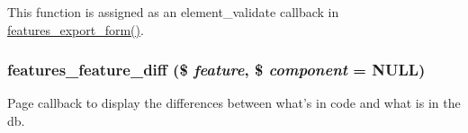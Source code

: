 This function is assigned as an element\_\-validate callback in \hyperlink{group__forms_gac6d72d74ab676748b1197536446c1063}{features\_\-export\_\-form()}. \hypertarget{features_8admin_8inc_a4865491ed8883d5be90311f3248bb785}{
\subsubsection[{features\_\-feature\_\-diff}]{\setlength{\rightskip}{0pt plus 5cm}features\_\-feature\_\-diff (\$ {\em feature}, \/  \$ {\em component} = {\ttfamily NULL})}}
\label{features_8admin_8inc_a4865491ed8883d5be90311f3248bb785}
Page callback to display the differences between what's in code and what is in the db.


